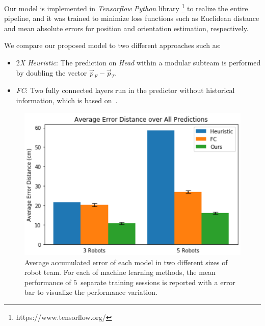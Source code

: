 \documentclass[letterpaper, 10 pt, conference]{ieeeconf}  %
\begin{document}
	Our model is implemented in \emph{Tensorflow} \emph{Python} library \footnote{https://www.tensorflow.org/}
	to realize the entire pipeline, and it was trained to minimize
	loss functions such as Euclidean distance and mean absolute errors
	for position and orientation estimation, respectively.

	We compare our proposed model to two different approaches such as:
	\begin{itemize}
		\item \emph{$2$X Heuristic}:
		The prediction on \emph{Head} within a modular subteam is performed by doubling the vector
		$\vec{p}_{F} - \vec{p}_{T}$.

		\item \emph{FC}:
		Two fully connected layers run in the predictor without historical
		information, which is based on~\cite{CPR17}.

	\end{itemize}




	\begin{figure}[t]
	\centering
	\includegraphics[width=1.\columnwidth]{fig_macro_eval}
	\caption{Average accumulated error of each model in two different sizes of robot team.
		For each of machine learning methods, the mean performance of $5$~separate training
		sessions is reported with a error bar to visualize the performance variation.
	}
	\label{fig:macro_eval}
	\end{figure}
\end{document}
